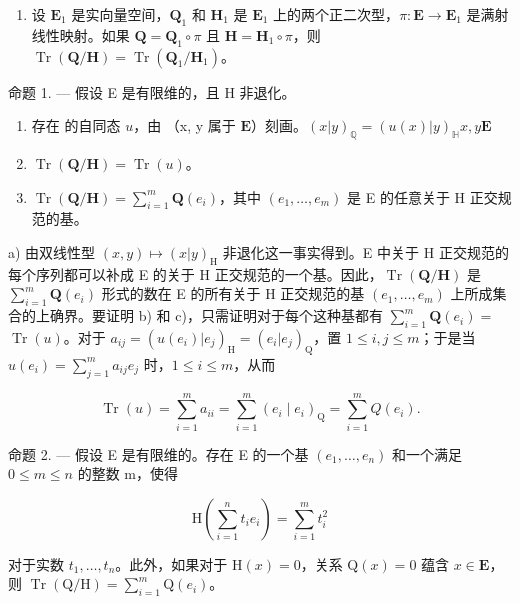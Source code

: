 \begin{enumerate}
\def\labelenumi{\arabic{enumi})}
\setcounter{enumi}{1}
\tightlist
\item
  设 \(\mathbf{E}_1\) 是实向量空间，\(\mathbf{Q}_1\) 和 \(\mathbf{H}_1\) 是 \(\mathbf{E}_1\) 上的两个正二次型，\(\pi: \mathbf{E} \to \mathbf{E}_1\) 是满射线性映射。如果 \(\mathbf{Q} = \mathbf{Q}_1 \circ \pi\) 且 \(\mathbf{H} = \mathbf{H}_1 \circ \pi\)，则 \(\operatorname{Tr}(\mathbf{Q} / \mathbf{H}) = \operatorname{Tr}(\mathbf{Q}_1 / \mathbf{H}_1)\)。
\end{enumerate}

命题 1. --- 假设 E 是有限维的，且 H 非退化。

\begin{enumerate}
\def\labelenumi{\alph{enumi})}
\item
  存在  的自同态 \(u\)，由 （x, y 属于 \(\mathbf{E}\)）刻画。\((x|y)_{\mathbb{Q}} = (u(x)|y)_{\mathbb{H}}\)\(x, y\)\(\mathbf{E}\)
\item
  \(\operatorname{Tr}(\mathbf{Q} / \mathbf{H}) = \operatorname{Tr}(u)\)。
\item
  \(\operatorname{Tr}(\mathbf{Q} / \mathbf{H}) = \sum_{i=1}^{m} \mathbf{Q}(e_i)\)，其中 \((e_1, \ldots, e_m)\) 是 E 的任意关于 H 正交规范的基。
\end{enumerate}

 a) 由双线性型 \((x,y)\mapsto (x|y)_{\mathrm{H}}\) 非退化这一事实得到。E 中关于 H 正交规范的每个序列都可以补成 E 的关于 H 正交规范的一个基。因此，\(\operatorname {Tr}(\mathbf{Q} / \mathbf{H})\) 是 \(\sum_{i = 1}^{m}\mathbf{Q}(e_i)\) 形式的数在 E 的所有关于 H 正交规范的基 \((e_1,\ldots ,e_m)\) 上所成集合的上确界。要证明 b) 和 c)，只需证明对于每个这种基都有 \(\sum_{i = 1}^{m}\mathbf{Q}(e_i) =\) \(\operatorname {Tr}(u)\)。对于 \(a_{ij} = (u(e_i)|e_j)_{\mathrm{H}} = (e_i|e_j)_{\mathrm{Q}}\)，置 \(1\leqslant i,j\leqslant m\)；于是当 \(u(e_i) = \sum_{j = 1}^{m}a_{ij}e_j\) 时，\(1\leqslant i\leqslant m\)，从而

\[
\operatorname{Tr} (u) = \sum_ {i = 1} ^ {m} a _ {i i} = \sum_ {i = 1} ^ {m} \left(e _ {i} \mid e _ {i}\right) _ {\mathrm{Q}} = \sum_ {i = 1} ^ {m} Q \left(e _ {i}\right).\tag{Q.E.D.}
\]

命题 2. --- 假设 E 是有限维的。存在 E 的一个基 \((e_{1},\ldots,e_{n})\) 和一个满足 \(0\leqslant m\leqslant n\) 的整数 m，使得

\[
\mathrm{H} \left(\sum_ {i = 1} ^ {n} t _ {i} e _ {i}\right) = \sum_ {i = 1} ^ {m} t _ {i} ^ {2}\tag{1}
\]

对于实数 \(t_1, \ldots, t_n\)。此外，如果对于 \(\mathrm{H}(x) = 0\)，关系 \(\mathrm{Q}(x) = 0\) 蕴含 \(x \in \mathbf{E}\)，则 \(\operatorname{Tr}(\mathrm{Q}/\mathrm{H}) = \sum_{i=1}^{m} \mathrm{Q}(e_i)\)。

